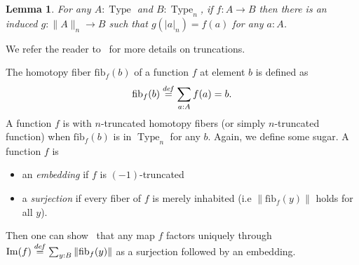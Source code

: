 \documentclass[preprint,9pt,numbers]{sigplanconf}
\newtheorem{lem}[thm]{Lemma}
\newcommand \defeq {\overset{de\hspace{-0.2ex}f}{=}}
\DeclareMathOperator{\Type}{Type}
\DeclareMathOperator{\HProp}{HProp}
\DeclareMathOperator{\im}{Im}
\newcommand \squash[1] {\| #1 \| }
\newcommand \fib[2] {\mathrm{fib}_{#1}(#2)}
\newenvironment{mymath}[1][-0em]{%
  \newcommand\mymathaux{\vspace{#1}}%
  \vspace{#1}%
  \begin{equation*}%
  }{ %
    \mymathaux%
  \end{equation*}}
\begin{document}

\begin{lem}
  For any $A:\Type$ and $B:\Type_n$, if $f:A \to B$ then there is an
  induced $g:\|A\|_n\to B$ such that $g(|a|_n)= f(a)$ for any $a:A$.
\end{lem}
%
We refer the reader to~\cite[7.3]{hottbook} for more details on 
truncations.

%
The homotopy fiber $\fib{f}{b}$ of a function $f$ at element $b$ is
defined as 
\begin{mymath}[-0.3em]
\fib{f}{b} \defeq \sum_{a:A} f(a) = b.
\end{mymath}%
%
A function $f$ is with $n$-truncated homotopy fibers (or simply
$n$-truncated function) when $\fib{f}{b}$
is in $\Type_n$ for any $b$.  
%
Again, we define some sugar. A function $f$ is 
\begin{itemize}
\item an {\em embedding} if $f$ is $(-1)$-truncated
\item a {\em surjection} if every fiber of $f$ is merely inhabited
  (i.e $\|\fib f y\|$ holds for all $y$).
\end{itemize}
Then one can show~\cite[Lemma 7.6.4]{hottbook} that any map $f$
factors uniquely through $\im(f) \defeq \sum_{y:B} \|\fib f y\|$ as a
surjection followed by an embedding.
\end{document}
